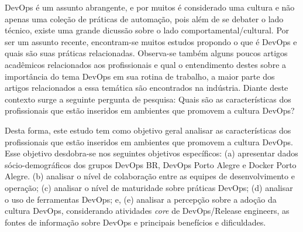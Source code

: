 \documentclass[twoside,english,brazilian]{UNISINOSartigo}
\begin{document}
DevOps é um assunto abrangente, e por muitos é considerado uma cultura e não apenas uma coleção de práticas de automação, pois além de se debater o lado técnico, existe uma grande dicussão sobre o lado comportamental/cultural. Por ser um assunto recente, encontram-se muitos estudos propondo o que é DevOps e quais são suas práticas relacionadas. Observa-se também alguns poucos artigos acadêmicos relacionados aos profissionais e qual o entendimento destes sobre a importância do tema DevOps em sua rotina de trabalho, a maior parte dos artigos relacionados a essa temática são encontrados na indústria. Diante deste contexto surge a seguinte pergunta de pesquisa: Quais são as características dos profissionais que estão inseridos em ambientes que promovem a cultura DevOps?

Desta forma, este estudo tem como objetivo geral analisar as características dos profissionais que estão inseridos em ambientes que promovem a cultura DevOps. Esse objetivo desdobra-se nos seguintes objetivos específicos: (a) apresentar dados sócio-demográficos dos grupos DevOps BR, DevOps Porto Alegre e Docker Porto Alegre. (b) analisar o nível de colaboração entre as equipes de desenvolvimento e operação; (c) analisar o nível de maturidade sobre práticas DevOps; (d) analisar o uso de ferramentas DevOps; e, (e) analisar a percepção sobre a adoção da cultura DevOps, considerando atividades \textit{core} de DevOps/Release engineers, as fontes de informação sobre DevOps e principais benefícios e dificuldades.



\end{document}
